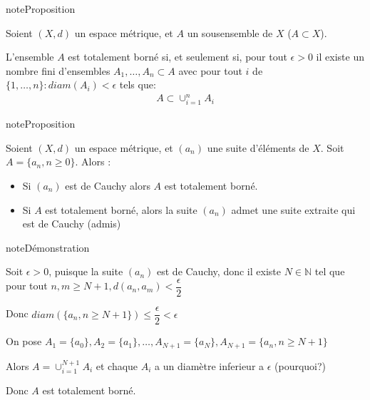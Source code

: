 \documentclass[letterpaper,10pt,french]{sphinxmanual}
\begin{document}
\begin{sphinxadmonition}{note}{Proposition}

\sphinxAtStartPar
Soient \((X, d)\) un espace métrique, et \(A\) un sous\sphinxhyphen{}ensemble de \(X\) (\(A\subset X\)).

\sphinxAtStartPar
L’ensemble \(A\) est totalement borné si, et seulement si, pour tout \(\epsilon>0\) il existe un nombre fini d’ensembles \(A_1, \ldots, A_n \subset A\) avec pour tout \(i\) de \(\{1, \ldots, n\}: diam(A_i)<\epsilon\) tels que:
\begin{equation*}
\begin{split}
A\subset \cup_{i=1}^n A_i
\end{split}
\end{equation*}\end{sphinxadmonition}

\begin{sphinxadmonition}{note}{Proposition}

\sphinxAtStartPar
Soient \((X, d)\) un espace métrique, et \((a_n)\) une suite d’éléments de \(X\). Soit \(A= \{a_n, n\geq 0\}\). Alors :
\begin{itemize}
\item {} 
\sphinxAtStartPar
Si \((a_n)\) est de Cauchy alors \(A\) est totalement borné.

\item {} 
\sphinxAtStartPar
Si \(A\) est totalement borné, alors la suite \((a_n)\) admet une suite extraite qui est de Cauchy (admis)

\end{itemize}
\end{sphinxadmonition}

\begin{sphinxadmonition}{note}{Démonstration}

\sphinxAtStartPar
Soit \(\epsilon>0\), puisque la suite \((a_n)\) est de Cauchy, donc il existe \(N\in \mathbb N\) tel que pour tout \(n, m \geq N+1, d(a_n, a_m)<\dfrac{\epsilon}{2}\)

\sphinxAtStartPar
Donc \( diam(\{a_n, n\geq N+1\}) \leq \dfrac{\epsilon}{2} < \epsilon\)

\sphinxAtStartPar
On pose \(A_1=\{a_0\}, A_2=\{a_1\}, \ldots, A_{N+1}=\{a_{N}\}, A_{N+1}=\{a_n, n\geq N+1\}\)

\sphinxAtStartPar
Alors \(A = \cup_{i=1}^{N+1}A_i\) et chaque \(A_i\) a un diamètre inferieur a \(\epsilon\) (pourquoi?)

\sphinxAtStartPar
Donc \(A\) est totalement borné.
\end{sphinxadmonition}
\end{document}
